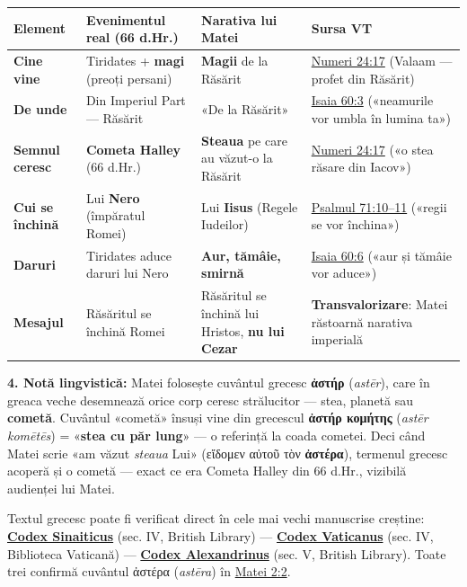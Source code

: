 \documentclass[12pt,a4paper,twoside,openany]{book}
\begin{document}
\begin{center}
\small
\begin{tabular}{L{1.5cm}L{3.2cm}L{4.7cm}L{5.3cm}}
\toprule
{}
\textbf{Element} & \textbf{Evenimentul real (66 d.Hr.)} & \textbf{Narativa lui Matei} & \textbf{Sursa VT} \\
\midrule
\textbf{Cine vine} & Tiridates + \textbf{magi} (preoți persani) & \textbf{Magii} de la Răsărit & \href{https://bibliaortodoxa.ro/carte.php?id=59\&cap=24\#17}{Numeri 24:17} (Valaam — profet din Răsărit) \\
\textbf{De unde} & Din Imperiul Part — Răsărit & «De la Răsărit» & \href{https://bibliaortodoxa.ro/carte.php?id=43\&cap=60\#3}{Isaia 60:3} («neamurile vor umbla în lumina ta») \\
\textbf{Semnul ceresc} & \textbf{Cometa Halley} (66 d.Hr.) & \textbf{Steaua} pe care au văzut-o la Răsărit & \href{https://bibliaortodoxa.ro/carte.php?id=59\&cap=24\#17}{Numeri 24:17} («o stea răsare din Iacov») \\
\textbf{Cui se închină} & Lui \textbf{Nero} (împăratul Romei) & Lui \textbf{Iisus} (Regele Iudeilor) & \href{https://bibliaortodoxa.ro/carte.php?id=65\&cap=71\#10}{Psalmul 71:10–11} («regii se vor închina») \\
\textbf{Daruri} & Tiridates aduce daruri lui Nero & \textbf{Aur, tămâie, smirnă} & \href{https://bibliaortodoxa.ro/carte.php?id=43\&cap=60\#6}{Isaia 60:6} («aur și tămâie vor aduce») \\
\textbf{Mesajul} & Răsăritul se închină Romei & Răsăritul se închină lui Hristos, \textbf{nu lui Cezar} & \textbf{Transvalorizare}: Matei răstoarnă narativa imperială \\
\bottomrule
\end{tabular}
\end{center}
\normalsize
\textbf{4. Notă lingvistică:} Matei folosește cuvântul grecesc \textbf{ἀστήρ} (\textit{astēr}), care în greaca veche desemnează orice corp ceresc strălucitor — stea, planetă sau \textbf{cometă}. Cuvântul «cometă» însuși vine din grecescul \textbf{ἀστήρ κομήτης} (\textit{astēr komētēs}) = «\textbf{stea cu păr lung}» — o referință la coada cometei. Deci când Matei scrie «am văzut \textit{steaua} Lui» (εἴδομεν αὐτοῦ τὸν \textbf{ἀστέρα}), termenul grecesc acoperă și o cometă — exact ce era Cometa Halley din 66 d.Hr., vizibilă audienței lui Matei.

Textul grecesc poate fi verificat direct în cele mai vechi manuscrise creștine:
\textbf{\href{https://codexsinaiticus.org/en/manuscript.aspx?book=33}{Codex Sinaiticus}} (sec. IV, British Library) —
\textbf{\href{https://digi.vatlib.it/view/MSS_Vat.gr.1209}{Codex Vaticanus}} (sec. IV, Biblioteca Vaticană) —
\textbf{\href{https://manuscripta-mediaevalia.de/dokumente/html/obj31570009}{Codex Alexandrinus}} (sec. V, British Library).
Toate trei confirmă cuvântul ἀστέρα (\textit{astēra}) în \href{https://bibliaortodoxa.ro/carte.php?id=55\&cap=2\#2}{Matei 2:2}.
\end{document}
